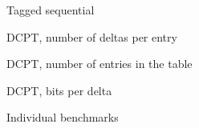 \documentclass{beamer}
\begin{document}
\begin{frame}{Tagged sequential}

\end{frame}

\begin{frame}{DCPT, number of deltas per entry}

\end{frame}

\begin{frame}{DCPT, number of entries in the table}

\end{frame}

\begin{frame}{DCPT, bits per delta}

\end{frame}

\begin{frame}{Individual benchmarks}

\end{frame}
\end{document}
